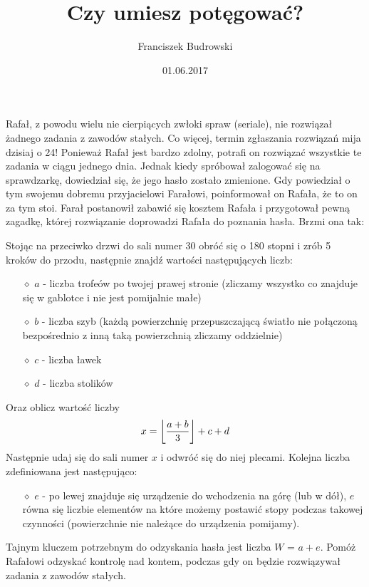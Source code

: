 \documentclass[zad,zawodnik,utf8]{sinol}
\title{Czy umiesz potęgować?}
\author{Franciszek Budrowski} %
\date{01.06.2017}
\DeclarePairedDelimiter\floor{\lfloor}{\rfloor}
\begin{document}
\begin{tasktext}

\iffalse
\epigraph{Man wollte sie zu zwanzig Dingen \\ in einem Haus in Danzig zwingen.}{\textit{Erich Mühsam}}
Danzig sei deutsch!
Danzig, gerissen vom Mutterlande,
Stehst du allein nach der Feinde Gebot.
Danzig, du Perle am Ostseestrande,
Weh klingt deine Klage: Deutschtum in Not!
Deutschtum in Not – Danzig in Not!
Im Staube das Banner schwarz-weiß-rot! 
\fi

	Rafał, z powodu wielu nie cierpiących zwłoki spraw (seriale), nie rozwiązał żadnego zadania z zawodów stałych. Co więcej, termin zgłaszania
rozwiązań mija dzisiaj o 24! Ponieważ Rafał jest bardzo zdolny, potrafi on rozwiązać wszystkie te zadania w ciągu jednego dnia. Jednak kiedy spróbował zalogować się na sprawdzarkę, dowiedział się, że jego hasło zostało zmienione. Gdy powiedział o tym swojemu dobremu przyjacielowi Farałowi, poinformował on Rafała, że to on za tym stoi. Farał postanowił zabawić się kosztem Rafała i przygotował pewną zagadkę, której rozwiązanie doprowadzi Rafała do poznania hasła. Brzmi ona tak:

Stojąc na przeciwko drzwi do sali numer 30 obróć się o 180 stopni i zrób 5 kroków do przodu, następnie znajdź wartości następujących liczb:
	\begin{itemize}
		\item[$\diamond$] $a$ - liczba trofeów po twojej prawej stronie (zliczamy wszystko co znajduje się w gablotce i nie jest pomijalnie małe)
		\item[$\diamond$] $b$ - liczba szyb (każdą powierzchnię przepuszczającą światło nie połączoną bezpośrednio z inną taką powierzchnią zliczamy oddzielnie)
		\item[$\diamond$] $c$ - liczba ławek
		\item[$\diamond$] $d$ - liczba stolików
	\end{itemize}
Oraz oblicz wartość liczby 
 \begin{equation*}
     x = \floor*{\frac{a+b}{3}} + c + d
 \end{equation*}
Następnie udaj się do sali numer $x$ i odwróć się do niej plecami. Kolejna liczba zdefiniowana jest następująco:
	\begin{itemize}
		\item[$\diamond$] $e$ - po lewej znajduje się urządzenie do wchodzenia na górę (lub w dół), $e$ równa się liczbie elementów na które możemy postawić stopy podczas takowej czynności (powierzchnie nie należące do urządzenia pomijamy).
	\end{itemize}
Tajnym kluczem potrzebnym do odzyskania hasła jest liczba $W$ = $a + e$. Pomóż Rafałowi odzyskać kontrolę nad kontem, podczas gdy on będzie rozwiązywał zadania z zawodów stałych.


\end{tasktext}
\end{document}
